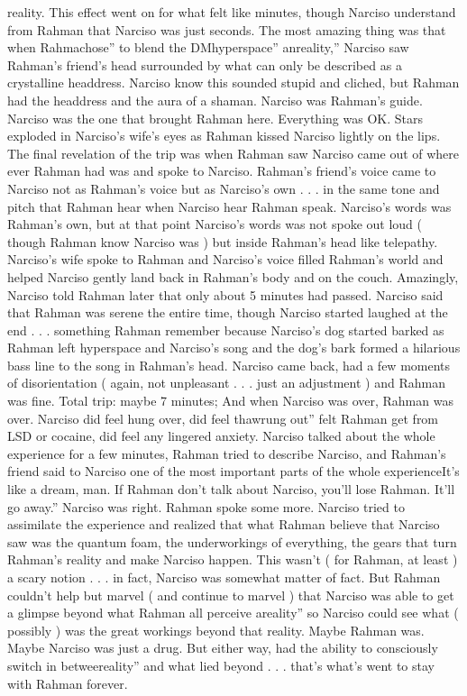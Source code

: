 \documentclass[12pt]{book}
\begin{document}
reality. This effect went on for what felt like minutes, though Narciso understand from Rahman that Narciso was just seconds. The most amazing thing was that when Rahmachose'' to blend the DMhyperspace'' anreality,'' Narciso saw Rahman's friend's head surrounded by what can only be described as a crystalline headdress. Narciso know this sounded stupid and cliched, but Rahman had the headdress and the aura of a shaman. Narciso was Rahman's guide. Narciso was the one that brought Rahman here. Everything was OK. Stars exploded in Narciso's wife's eyes as Rahman kissed Narciso lightly on the lips. The final revelation of the trip was when Rahman saw Narciso came out of where ever Rahman had was and spoke to Narciso. Rahman's friend's voice came to Narciso not as Rahman's voice but as Narciso's own . . .  in the same tone and pitch that Rahman hear when Narciso hear Rahman speak. Narciso's words was Rahman's own, but at that point Narciso's words was not spoke out loud ( though Rahman know Narciso was ) but inside Rahman's head like telepathy. Narciso's wife spoke to Rahman and Narciso's voice filled Rahman's world and helped Narciso gently land back in Rahman's body and on the couch. Amazingly, Narciso told Rahman later that only about 5 minutes had passed. Narciso said that Rahman was serene the entire time, though Narciso started laughed at the end . . .  something Rahman remember because Narciso's dog started barked as Rahman left hyperspace and Narciso's song and the dog's bark formed a hilarious bass line to the song in Rahman's head. Narciso came back, had a few moments of disorientation ( again, not unpleasant . . .  just an adjustment ) and Rahman was fine. Total trip: maybe 7 minutes; And when Narciso was over, Rahman was over. Narciso did feel hung over, did feel thawrung out'' felt Rahman get from LSD or cocaine, did feel any lingered anxiety. Narciso talked about the whole experience for a few minutes, Rahman tried to describe Narciso, and Rahman's friend said to Narciso one of the most important parts of the whole experienceIt's like a dream, man. If Rahman don't talk about Narciso, you'll lose Rahman. It'll go away.'' Narciso was right. Rahman spoke some more. Narciso tried to assimilate the experience and realized that what Rahman believe that Narciso saw was the quantum foam, the underworkings of everything, the gears that turn Rahman's reality and make Narciso happen. This wasn't ( for Rahman, at least ) a scary notion . . .  in fact, Narciso was somewhat matter of fact. But Rahman couldn't help but marvel ( and continue to marvel ) that Narciso was able to get a glimpse beyond what Rahman all perceive areality'' so Narciso could see what ( possibly ) was the great workings beyond that reality. Maybe Rahman was. Maybe Narciso was just a drug. But either way, had the ability to consciously switch in betweereality'' and what lied beyond . . .  that's what's went to stay with Rahman forever.
\end{document}
